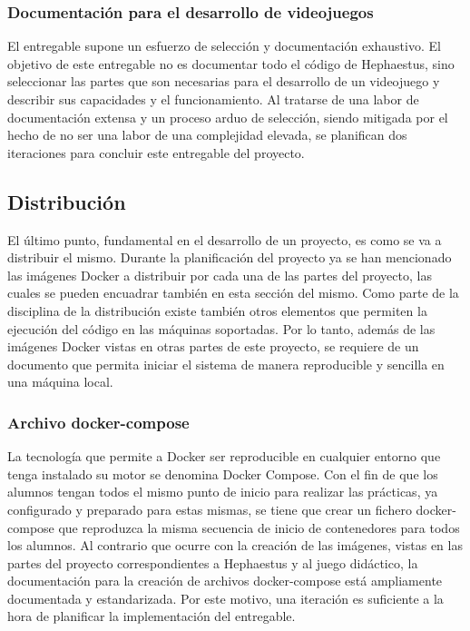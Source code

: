 \subsubsection{Documentación para el desarrollo de videojuegos}

El entregable supone un esfuerzo de selección y documentación exhaustivo. El objetivo de este entregable no es documentar todo el código de Hephaestus, sino seleccionar las partes que son necesarias para el desarrollo de un videojuego y describir sus capacidades y el funcionamiento. Al tratarse de una labor de documentación extensa y un proceso arduo de selección, siendo mitigada por el hecho de no ser una labor de una complejidad elevada, se planifican dos iteraciones para concluir este entregable del proyecto.

\subsection{Distribución}

El último punto, fundamental en el desarrollo de un proyecto, es como se va a distribuir el mismo. Durante la planificación del proyecto ya se han mencionado las imágenes Docker a distribuir por cada una de las partes del proyecto, las cuales se pueden encuadrar también en esta sección del mismo. Como parte de la disciplina de la distribución existe también otros elementos que permiten la ejecución del código en las máquinas soportadas. Por lo tanto, además de las imágenes Docker vistas en otras partes de este proyecto, se requiere de un documento que permita iniciar el sistema de manera reproducible y sencilla en una máquina local.

\subsubsection{Archivo docker-compose}

La tecnología que permite a Docker ser reproducible en cualquier entorno que tenga instalado su motor se denomina Docker Compose. Con el fin de que los alumnos tengan todos el mismo punto de inicio para realizar las prácticas, ya configurado y preparado para estas mismas, se tiene que crear un fichero docker-compose que reproduzca la misma secuencia de inicio de contenedores para todos los alumnos. Al contrario que ocurre con la creación de las imágenes, vistas en las partes del proyecto correspondientes a Hephaestus y al juego didáctico, la documentación para la creación de archivos docker-compose está ampliamente documentada y estandarizada. Por este motivo, una iteración es suficiente a la hora de planificar la implementación del entregable.

